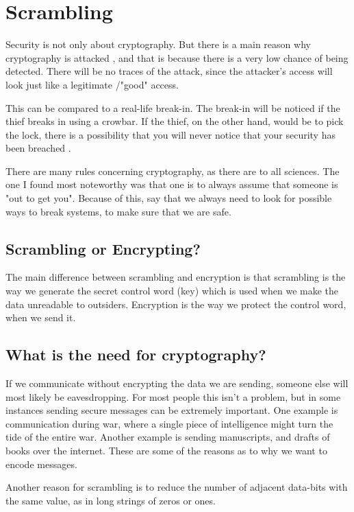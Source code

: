 \chapter{Scrambling}\label{ch:Scrambling}
Security is not only about cryptography. But there is a main reason why 
cryptography is attacked , and that is because there is a very low chance 
of being detected. There will be no traces of the attack, since the attacker’s 
access will look just like a legitimate /"good" access. 

This can be compared to a real-life break-in. The break-in will be noticed if 
the thief breaks in using a crowbar. If the thief, on the other hand, would be 
to pick the lock, there is a possibility that you will never notice that your 
security has been breached \citep{Schneier:2003}.

There are many rules concerning cryptography, as there are to all sciences. 
The one I found most noteworthy was that one is to always assume that someone 
is "out to get you". Because of this, \citet[pp. 12--14]{Schneier:2003} say that 
we always need  to look for possible ways to break systems, to make sure that
we are safe.

\section{Scrambling or Encrypting?}
The main difference between scrambling and encryption is that scrambling is the
way we generate the secret control word (key) which is used when we make the
data unreadable to outsiders. Encryption is the way we protect the control word, 
when we send it.

\section{What is the need for cryptography?}
If we communicate without encrypting the data we are sending, someone 
else will most likely be eavesdropping. For most people this isn’t a problem, 
but in some instances sending secure messages can be extremely important. One 
example is communication during war, where a single piece of intelligence might 
turn the tide of the entire war. Another example is sending manuscripts, and 
drafts of books over the internet. These are some of the reasons as to why we 
want to encode messages.

Another reason for scrambling is to reduce the number of adjacent data-bits with 
the same value, as in long strings of zeros or ones. 

